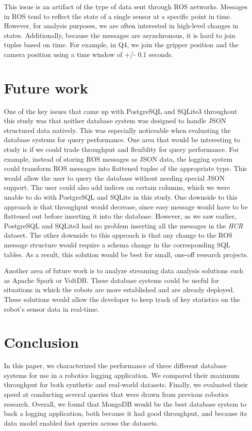 \documentclass[nocopyrightspace]{acm_proc_article-sp}
\begin{document}
This issue is an artifact of the type of data sent through ROS networks. Messages in ROS tend to reflect the state of a single sensor at a specific point in time. However, for analysis purposes, we are often interested in high-level changes in states. Additionally, because the messages are asynchronous, it is hard to join tuples based on time. For example, in Q4, we join the gripper position and the camera position using a time window of +/- 0.1 seconds.

\section{Future work}
One of the key issues that came up with PostgreSQL and SQLite3 throughout this study was that neither database system was designed to handle JSON structured data natively. This was especially noticeable when evaluating the database systems for query performance. One area that would be interesting to study is if we could trade throughput and flexiblity for query performance. For example, instead of storing ROS messages as JSON data, the logging system could transform ROS messages into flattened tuples of the appropriate type. This would allow the user to query the database without needing special JSON support. The user could also add indices on certain columns, which we were unable to do with PostgreSQL and SQLite in this study. One downside to this approach is that throughput would decrease, since easy message would have to be flattened out before inserting it into the database. However, as we saw earlier, PostgreSQL and SQLite3 had no problem inserting all the messages in the \textit{HCR} dataset. The other downside to this approach is that any change to the ROS message structure would require a schema change in the corresponding SQL tables. As a result, this solution would be best for small, one-off research projects.

Another area of future work is to analyze streaming data analysis solutions such as Apache Spark or VoltDB. These database systems could be useful for situations in which the robots are more established and are already deployed. These solutions would allow the developer to keep track of key statistics on the robot's sensor data in real-time.

\section{Conclusion}
In this paper, we characterized the performance of three different database systems for use in a robotics logging application. We compared their maximum throughput for both synthetic and real-world datasets. Finally, we evaluated their speed at conducting several queries that were drawn from previous robotics research. Overall, we found that MongoDB would be the best database system to back a logging application, both because it had good throughput, and because its data model enabled fast queries across the datasets.
\end{document}
